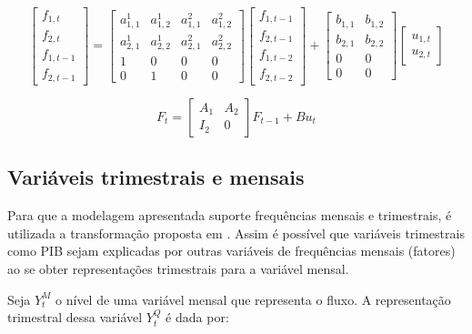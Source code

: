 \documentclass{article}
\begin{document}
\begin{equation}
\begin{bmatrix}
f_{1,t}\\
f_{2,t}\\
f_{1,t-1}\\
f_{2,t-1}
\end{bmatrix}
=
\begin{bmatrix}
a^1_{1,1} & a^1_{1,2} & a^2_{1,1} & a^2_{1,2} \\
a^1_{2,1} & a^1_{2,2} & a^2_{2,1} & a^2_{2,2} \\
1 & 0 & 0 & 0 \\
0 & 1 & 0 & 0
\end{bmatrix}
\begin{bmatrix}
f_{1,t-1}\\
f_{2,t-1}\\
f_{1,t-2}\\
f_{2,t-2}
\end{bmatrix}
+
\begin{bmatrix}
b_{1,1} & b_{1,2}\\
b_{2,1} & b_{2,2}\\
0 & 0\\
0 & 0
\end{bmatrix}
\begin{bmatrix}
u_{1,t}\\
u_{2,t}
\end{bmatrix}
\end{equation}


\begin{equation}
F_t
=
\begin{bmatrix}
A_1 & A_2 \\
I_2 & 0
\end{bmatrix}
F_{t-1}
+
B
u_t
\end{equation}


\subsection{Variáveis trimestrais e mensais}\label{variaveisQM}

Para que a modelagem apresentada suporte frequências mensais e trimestrais, é utilizada a transformação proposta em \cite{marianomurasawa2003}. Assim é possível que variáveis trimestrais como PIB sejam explicadas por outras variáveis de frequências mensais (fatores) ao se obter representações trimestrais para a variável mensal.

Seja $Y_t^M$ o nível de uma variável mensal que representa o fluxo. A representação trimestral dessa variável $Y_t^Q$ é dada por:
\end{document}

